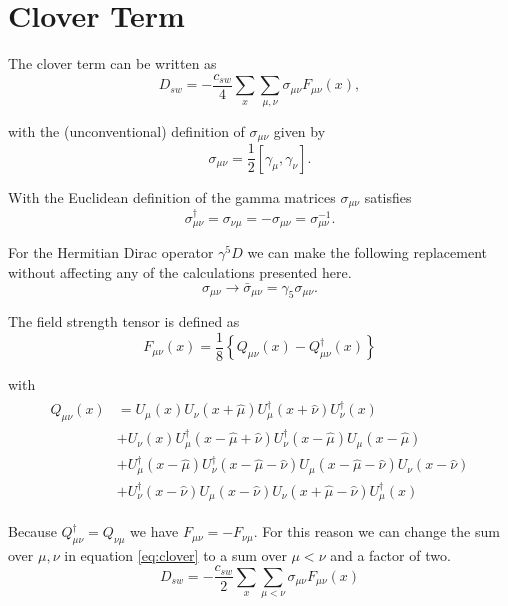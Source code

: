 \documentclass[12pt]{article}
\begin{document}
\section*{Clover Term}
The clover term can be written as
\begin{equation}
 D_{sw} = -\frac{c_{sw}}{4}\sum_x\sum_{\mu,\nu}\sigma_{\mu\nu}F_{\mu\nu}(x),
 \label{eq:clover}
\end{equation}

with the (unconventional) definition of $\sigma_{\mu\nu}$ given by
\begin{equation}
 \sigma_{\mu\nu} = \frac{1}{2}[\gamma_\mu,\gamma_\nu].
\end{equation}

With the Euclidean definition of the gamma matrices $\sigma_{\mu\nu}$ satisfies
\begin{equation}
 \sigma_{\mu\nu}^\dagger = \sigma_{\nu\mu} = -\sigma_{\mu\nu} = \sigma_{\mu\nu}^{-1}.
\end{equation}

For the Hermitian Dirac operator $\gamma^5D$ we can make the following replacement without affecting any of the calculations presented here.
\begin{equation}
 \sigma_{\mu\nu} \to \bar{\sigma}_{\mu\nu} = \gamma_5\sigma_{\mu\nu}.
\end{equation}

The field strength tensor is defined as
\begin{equation}
 F_{\mu\nu}(x) = \frac{1}{8}\left\{Q_{\mu\nu}(x) - Q_{\mu\nu}^\dagger(x)\right\}
\end{equation}

with
\begin{align}
\begin{split}
 Q_{\mu\nu}(x)
 &= U_\mu(x)U_\nu(x+\hat{\mu})U_\mu^\dagger(x+\hat{\nu})U_\nu^\dagger(x) \\
 &+ U_\nu(x)U_\mu^\dagger(x-\hat{\mu}+\hat{\nu})U_\nu^\dagger(x-\hat{\mu})U_\mu(x-\hat{\mu}) \\
 &+ U_\mu^\dagger(x-\hat{\mu})U_\nu^\dagger(x-\hat{\mu}-\hat{\nu})U_\mu(x-\hat{\mu}-\hat{\nu})U_\nu(x-\hat{\nu}) \\
 &+ U_\nu^\dagger(x-\hat{\nu})U_\mu(x-\hat{\nu})U_\nu(x+\hat{\mu}-\hat{\nu})U_\mu^\dagger(x)
\end{split}
\end{align}

Because $Q_{\mu\nu}^\dagger=Q_{\nu\mu}$ we have $F_{\mu\nu}=-F_{\nu\mu}$. For this reason we can change the sum over $\mu,\nu$ in equation \eqref{eq:clover} to a sum over $\mu<\nu$ and a factor of two.
\begin{equation}
 D_{sw} = -\frac{c_{sw}}{2}\sum_x\sum_{\mu<\nu}\sigma_{\mu\nu}F_{\mu\nu}(x)
 \label{eq:clover2}
\end{equation}
\end{document}
